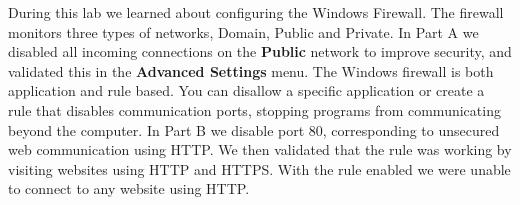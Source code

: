 During this lab we learned about configuring the Windows Firewall.
The firewall monitors three types of networks, Domain, Public and Private.
In Part A we disabled all incoming connections on the \textbf{Public} network to improve security, and validated this in the \textbf{Advanced Settings} menu.
The Windows firewall is both application and rule based.
You can disallow a specific application or create a rule that disables communication ports, stopping programs from communicating beyond the computer.
In Part B we disable port 80, corresponding to unsecured web communication using HTTP.
We then validated that the rule was working by visiting websites using HTTP and HTTPS.
With the rule enabled we were unable to connect to any website using HTTP.